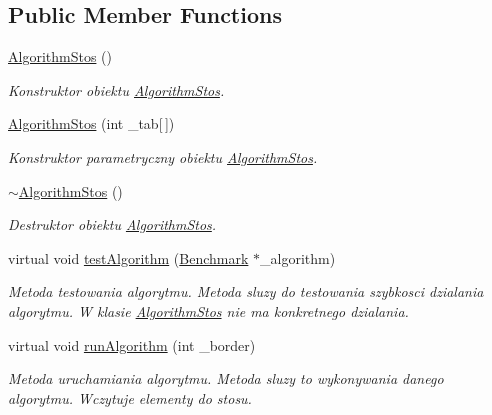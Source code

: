 \subsection*{Public Member Functions}
\begin{DoxyCompactItemize}
\item 
\hyperlink{class_algorithm_stos_a0d987377d7c5d9cea3152680ba437cd3}{Algorithm\+Stos} ()
\begin{DoxyCompactList}\small\item\em Konstruktor obiektu \hyperlink{class_algorithm_stos}{Algorithm\+Stos}. \end{DoxyCompactList}\item 
\hyperlink{class_algorithm_stos_a5dc7ad87d403c67d64aa6cac6a626992}{Algorithm\+Stos} (int \+\_\+tab\mbox{[}$\,$\mbox{]})
\begin{DoxyCompactList}\small\item\em Konstruktor parametryczny obiektu \hyperlink{class_algorithm_stos}{Algorithm\+Stos}. \end{DoxyCompactList}\item 
\hyperlink{class_algorithm_stos_a68a3733d5dfd9fefe38059f0ce0202bf}{$\sim$\+Algorithm\+Stos} ()
\begin{DoxyCompactList}\small\item\em Destruktor obiektu \hyperlink{class_algorithm_stos}{Algorithm\+Stos}. \end{DoxyCompactList}\item 
virtual void \hyperlink{class_algorithm_stos_a7fb987baf970d51f90ad880d27e537a4}{test\+Algorithm} (\hyperlink{class_benchmark}{Benchmark} $\ast$\+\_\+algorithm)
\begin{DoxyCompactList}\small\item\em Metoda testowania algorytmu. Metoda sluzy do testowania szybkosci dzialania algorytmu. W klasie \hyperlink{class_algorithm_stos}{Algorithm\+Stos} nie ma konkretnego dzialania. \end{DoxyCompactList}\item 
virtual void \hyperlink{class_algorithm_stos_a889f7150ae3651b40e5acca7542dbbd1}{run\+Algorithm} (int \+\_\+border)
\begin{DoxyCompactList}\small\item\em Metoda uruchamiania algorytmu. Metoda sluzy to wykonywania danego algorytmu. Wczytuje elementy do stosu. \end{DoxyCompactList}\end{DoxyCompactItemize}

